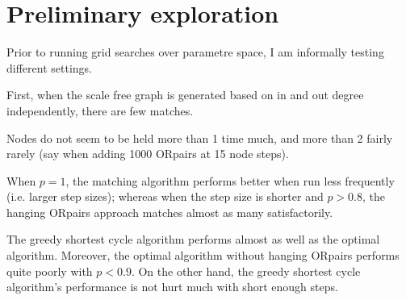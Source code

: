 \documentclass[main.tex]{subfiles}
\begin{document}
\section{Preliminary exploration}
Prior to running grid searches over parametre space, I am informally testing different settings.

First, when the scale free graph is generated based on in and out degree independently, there are few matches.

Nodes do not seem to be held more than 1 time much, and more than 2 fairly rarely (say when adding 1000 ORpairs at 15 node steps).

When $p=1$, the matching algorithm performs better when run less frequently (i.e. larger step sizes); whereas when the step size is shorter and $p > 0.8$, the hanging ORpairs approach matches almost as many satisfactorily.

The greedy shortest cycle algorithm performs almost as well as the optimal algorithm. Moreover, the optimal algorithm without hanging ORpairs performs quite poorly with $p < 0.9$. On the other hand, the greedy shortest cycle algorithm's performance is not hurt much with short enough steps.
\end{document}
